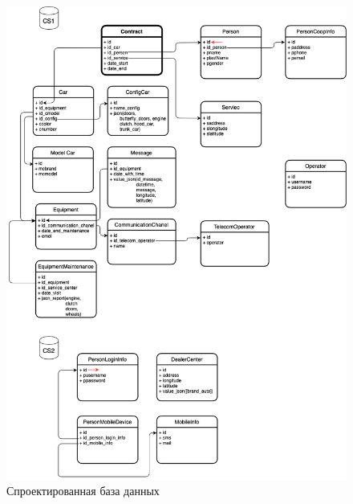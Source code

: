 \newpage
\begin{figure}[H]
	\centering
	\includegraphics[scale=0.52]{img/bd_cs.png}
	\caption{Спроектированная база данных}
	\label{img:db_cs}
\end{figure}


